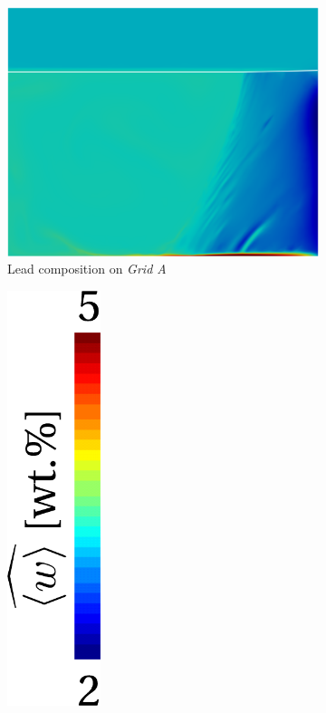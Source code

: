 \begin{figure}[H]
\centering
  \begin{subfigure}[t]{0.4\textwidth}
    \centering
  \includegraphics[width=\textwidth]{Chapter5/Graphics/2d/processed/1200s_compo.png}
  \caption{Lead composition on \emph{Grid A}}
    \label{fig:1200s_compo}
  \end{subfigure}
  \begin{subfigure}[t]{0.15\textwidth}
    \centering
  \includegraphics[width=0.3\textwidth]{Chapter5/Graphics/2d/colorbar_w.pdf}

\end{subfigure}
\end{figure}
